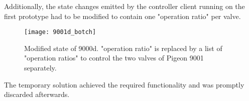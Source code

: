 Additionally, the state changes emitted by the controller client running on the first prototype had to be modified to contain one "operation ratio" per valve. 

\begin{figure}[H]
\centering

\texttt{[image: 9001d\_botch]}

\caption{Modified state of 9000d. "operation ratio" is replaced by a list of "operation ratios" to control the two valves of Pigeon 9001 separately.}
\end{figure}

The temporary solution achieved the required functionality and was promptly discarded afterwards.